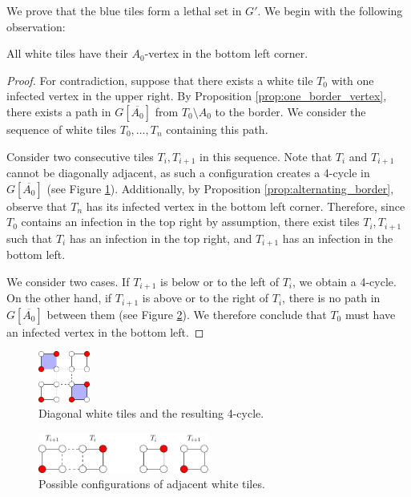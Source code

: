 We prove that the blue tiles form a lethal set in $G'$. We begin with the following observation:

\begin{prop}
\label{prop:bottom_left}
All white tiles have their $A_0$-vertex in the bottom left corner.
\end{prop}

\begin{proof}
For contradiction, suppose that there exists a white tile $T_0$ with one infected vertex in the upper right. By Proposition \ref{prop:one_border_vertex}, there exists a path in $G[\overline{A_0}]$ from $T_0 \setminus A_0$ to the border. We consider the sequence of white tiles $T_0, \dots, T_n$ containing this path. 

Consider two consecutive tiles $T_i, T_{i+1}$ in this sequence. Note that $T_i$ and $T_{i+1}$ cannot be diagonally adjacent, as such a configuration creates a 4-cycle in $G[\overline{A_0}]$ (see Figure \ref{fig:tile_cycle}). Additionally, by Proposition \ref{prop:alternating_border}, observe that $T_n$ has its infected vertex in the bottom left corner. Therefore, since $T_0$ contains an infection in the top right by assumption, there exist tiles $T_i, T_{i+1}$ such that $T_i$ has an infection in the top right, and $T_{i+1}$ has an infection in the bottom left. 

We consider two cases. If $T_{i+1}$ is below or to the left of $T_i$, we obtain a 4-cycle. On the other hand, if $T_{i+1}$ is above or to the right of $T_i$, there is no path in $G[\overline{A_0}]$ between them (see Figure \ref{fig:tile_cases}). We therefore conclude that $T_0$ must have an infected vertex in the bottom left.
\end{proof}

\begin{figure}[]
\centering
\includegraphics[width=0.15\textwidth]{figures/6/tile_cycle.pdf}
\caption{Diagonal white tiles and the resulting 4-cycle.}
\label{fig:tile_cycle}
\end{figure} 

\begin{figure}[]
\centering
\includegraphics[width=0.5\textwidth]{figures/6/tile_cases.pdf}
\caption{Possible configurations of adjacent white tiles.}
\label{fig:tile_cases}
\end{figure} 

